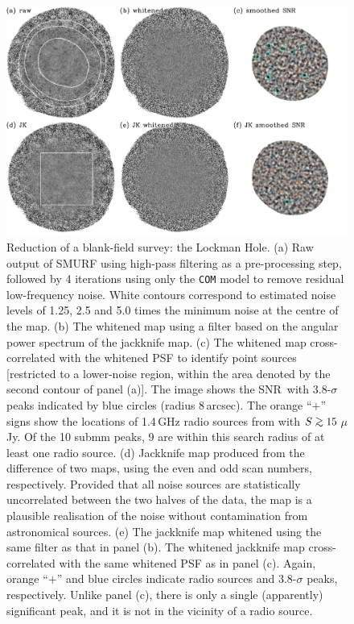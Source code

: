 \documentclass[useAMS,usenatbib,nofootinbib]{mn2e}
\newcommand{\snr}{SNR}
\def\gsim{\mathrel{\lower2.5pt\vbox{\lineskip=0pt\baselineskip=0pt
          \hbox{$>$}\hbox{$\sim$}}}}
\newcommand{\model}[1]{\texttt{#1}}
\begin{document}
\begin{figure}
\centering
\includegraphics[width=\linewidth]{lockman_maps}
\caption{Reduction of a blank-field survey: the Lockman Hole. (a) Raw
  output of SMURF using high-pass filtering as a pre-processing step,
  followed by 4 iterations using only the \model{COM} model to remove
  residual low-frequency noise. White contours correspond to estimated
  noise levels of 1.25, 2.5 and 5.0 times the minimum noise at the
  centre of the map. (b) The whitened map using a filter based on the
  angular power spectrum of the jackknife map. (c) The whitened map
  cross-correlated with the whitened PSF to identify point sources
  [restricted to a lower-noise region, within the area denoted by the
  second contour of panel (a)]. The image shows the \snr\, with
  3.8-$\sigma$ peaks indicated by blue circles (radius 8\,arcsec). The
  orange ``$+$'' signs show the locations of 1.4\,GHz radio sources
  from \citet{owen2008} with $S\gsim15$\,$\mu$Jy. Of the 10 submm
  peaks, 9 are within this search radius of at least one radio
  source. (d) Jackknife map produced from the difference of two maps,
  using the even and odd scan numbers, respectively. Provided that all
  noise sources are statistically uncorrelated between the two halves
  of the data, the map is a plausible realisation of the noise without
  contamination from astronomical sources. (e) The jackknife map
  whitened using the same filter as that in panel (b). The whitened
  jackknife map cross-correlated with the same whitened PSF as in
  panel (c). Again, orange ``$+$'' and blue circles indicate radio
  sources and 3.8-$\sigma$ peaks, respectively. Unlike panel (c),
  there is only a single (apparently) significant peak, and it is not
  in the vicinity of a radio source.}
\label{fig:lockman_maps}
\end{figure}
\end{document}
